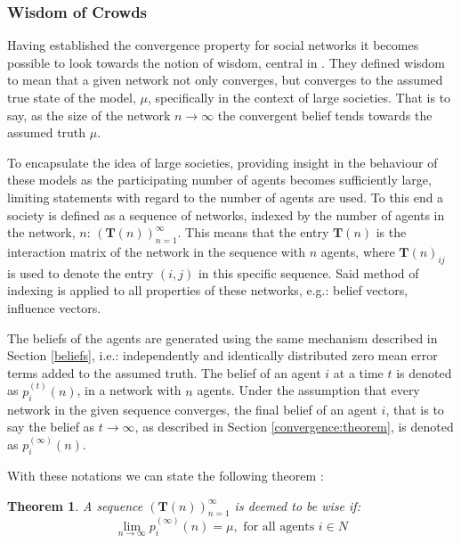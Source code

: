 \documentclass[a4paper, 12pt]{report}
\newtheorem{theorem}{Theorem}
\newcommand{\T}{\bm{T}}
\newcommand{\Soc}{(\T(n))^{\infty}_{n=1}}
\newcommand{\beli}[3][2]{p_{#2}^{(#3)}}
\begin{document}
\subsubsection{Wisdom of Crowds}
\label{wisdom}
Having established the convergence property for social networks it becomes possible to look towards the notion of wisdom, central in \cite{golub2010naive}. They defined wisdom to mean that a given network not only converges, but converges to the assumed true state of the model, $\mu$, specifically in the context of large societies. That is to say, as the size of the network $n\to\infty$ the convergent belief tends towards the assumed truth $\mu$.

\noindent To encapsulate the idea of large societies, providing insight in the behaviour of these models as the participating number of agents becomes sufficiently large, limiting statements with regard to the number of agents are used. To this end a society is defined as a sequence of networks, indexed by the number of agents in the network, $n$: $\Soc$. This means that the entry $\textbf{T}(n)$ is the interaction matrix of the network in the sequence with $n$ agents, where $\textbf{T}(n)_{ij}$ is used to denote the entry $(i,j)$ in this specific sequence. Said method of indexing is applied to all properties of these networks, e.g.: belief vectors, influence vectors.

\noindent The beliefs of the agents are generated using the same mechanism described in Section \ref{beliefs}, i.e.: independently and identically distributed zero mean error terms added to the assumed truth. The belief of an agent $i$ at a time $t$ is denoted as $\beli{i}{t}(n)$, in a network with $n$ agents. Under the assumption that every network in the given sequence converges, the final belief of an agent $i$, that is to say the belief as $t \to\infty$, as described in Section \ref{convergence:theorem}, is denoted as $\beli{i}{\infty}(n)$.

\newpage

\noindent With these notations we can state the following theorem \parencite{golub2010naive}:

\begin{theorem}
    A sequence $\Soc$ is deemed to be wise if:
    \begin{equation*}
    \label{wisdom:equation}
    \lim_{n \to \infty} \beli{i}{\infty}(n) = \mu, \text{ for all agents $i \in N$}
\end{equation*}
\end{theorem}
\end{document}
